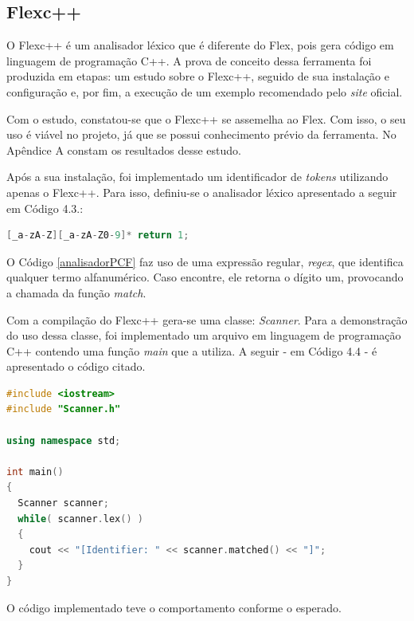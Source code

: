 \subsection{Flexc++} \label{flexcpp}
O Flexc++ é um analisador léxico que é diferente do Flex, pois gera código em
linguagem de programação C++. A prova de conceito dessa ferramenta foi produzida
em etapas: um estudo sobre o Flexc++, seguido de sua instalação e configuração
e, por fim, a execução de um exemplo recomendado pelo \textit{site} oficial.
\par
\indent Com o estudo, constatou-se que o Flexc++ se assemelha ao Flex. Com isso,
o seu uso é viável no projeto, já que se possui conhecimento prévio da
ferramenta. No Apêndice A constam os resultados desse estudo.
\par
\indent Após a sua instalação, foi implementado um identificador de \textit{tokens}
utilizando apenas o Flexc++. Para isso, definiu-se o analisador léxico apresentado
a seguir em Código 4.3.:

\begin{lstlisting}[language=C++, label=analisadorPCF, caption={Analisador Léxico da Prova de Conceito do Flexc++}]
%%
[_a-zA-Z][_a-zA-Z0-9]* return 1;
\end{lstlisting}
\par
\indent O Código \ref{analisadorPCF} faz uso de uma expressão regular,
\textit{regex}, que identifica qualquer termo alfanumérico. Caso encontre, ele
retorna o dígito um, provocando  a chamada da função \textit{match}.
\par
\indent Com a compilação do Flexc++ gera-se uma classe: \textit{Scanner}. Para
a demonstração do uso dessa classe, foi implementado um arquivo em linguagem de
programação C++ contendo uma função \textit{main} que a utiliza.
A seguir - em Código 4.4 - é apresentado o código citado.
\begin{lstlisting}[language=C++, label=mainPCF, caption={Função \textit{main} para demonstração do Flexc++}]
#include <iostream>
#include "Scanner.h"

using namespace std;

int main()
{
  Scanner scanner;
  while( scanner.lex() )
  {
    cout << "[Identifier: " << scanner.matched() << "]";
  }
}
\end{lstlisting}
\par
\indent O código implementado teve o comportamento conforme o esperado.

